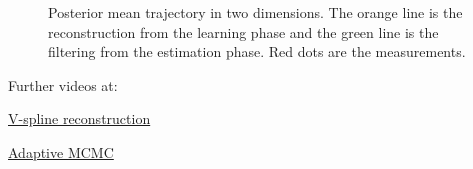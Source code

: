 \documentclass{beamer}
\begin{document}


\begin{frame}

\begin{figure}[h]
\centering
{}
\caption{Posterior mean trajectory in two dimensions. The orange line is the reconstruction from the learning phase and the green line is the filtering from the estimation phase. Red dots are the measurements.}
\end{figure} 
\end{frame}





\begin{frame}

Further videos at:

\href{https://www.youtube.com/watch?v=lQOSt8HrYRU&t=61s}{V-spline reconstruction} 

\href{https://www.youtube.com/watch?v=CF6Sut3G6eI&t=67s}{Adaptive MCMC} 

\end{frame}
\end{document}
